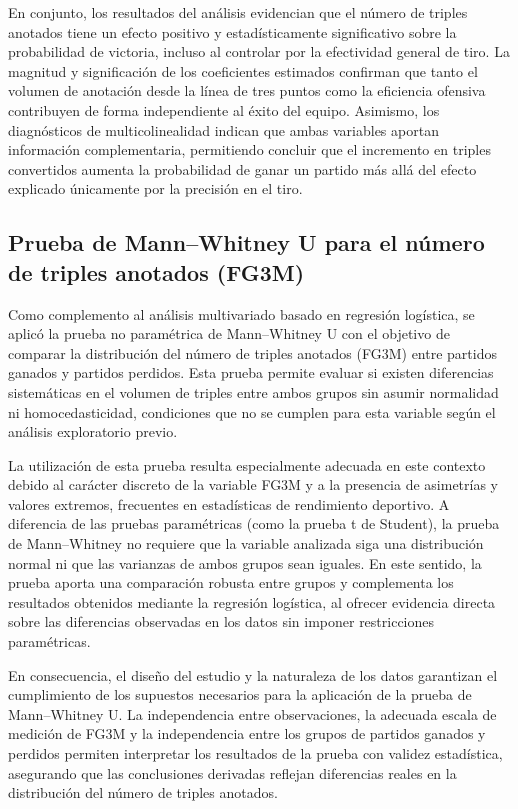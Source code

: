 \documentclass[12pt]{article}
\begin{document}
\vspace{0.3cm}
En conjunto, los resultados del análisis evidencian que el número de triples anotados tiene un efecto positivo y estadísticamente significativo sobre la probabilidad de victoria, incluso al controlar por la efectividad general de tiro. La magnitud y significación de los coeficientes estimados confirman que tanto el volumen de anotación desde la línea de tres puntos como la eficiencia ofensiva contribuyen de forma independiente al éxito del equipo. Asimismo, los diagnósticos de multicolinealidad indican que ambas variables aportan información complementaria, permitiendo concluir que el incremento en triples convertidos aumenta la probabilidad de ganar un partido más allá del efecto explicado únicamente por la precisión en el tiro.

\subsection{Prueba de Mann--Whitney U para el número de triples anotados (FG3M)}

Como complemento al análisis multivariado basado en regresión logística, se aplicó la
prueba no paramétrica de Mann--Whitney U con el objetivo de comparar la distribución del
número de triples anotados (FG3M) entre partidos ganados y partidos perdidos. Esta prueba
permite evaluar si existen diferencias sistemáticas en el volumen de triples entre ambos
grupos sin asumir normalidad ni homocedasticidad, condiciones que no se cumplen para esta
variable según el análisis exploratorio previo.

La utilización de esta prueba resulta especialmente adecuada en este contexto debido al
carácter discreto de la variable FG3M y a la presencia de asimetrías y valores extremos,
frecuentes en estadísticas de rendimiento deportivo. 
    A diferencia de las pruebas paramétricas (como la prueba t de Student), la prueba de
    Mann--Whitney no requiere que la variable analizada siga una distribución normal ni
    que las varianzas de ambos grupos sean iguales.
En este sentido, la prueba aporta
una comparación robusta entre grupos y complementa los resultados obtenidos mediante la
regresión logística, al ofrecer evidencia directa sobre las diferencias observadas en los
datos sin imponer restricciones paramétricas.

En consecuencia, el diseño del estudio y la naturaleza de los datos garantizan el
cumplimiento de los supuestos necesarios para la aplicación de la prueba de
Mann--Whitney U. La independencia entre observaciones, la adecuada escala de medición de
FG3M y la independencia entre los grupos de partidos ganados y perdidos permiten interpretar
los resultados de la prueba con validez estadística, asegurando que las conclusiones
derivadas reflejan diferencias reales en la distribución del número de triples anotados.
\end{document}
